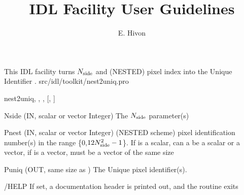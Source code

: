 
\sloppy


\title{\healpix IDL Facility User Guidelines}
 \section[nest2uniq]{ }
\label{idl:nest2uniq}
\author{E. Hivon}

\begin{facility}
{This IDL facility turns $N_{\rm side}$ and (NESTED) pixel index into the Unique Identifier  . 
}
{src/idl/toolkit/nest2uniq.pro}
\end{facility}

\begin{IDLformat}
{nest2uniq, 
,
,
[,%
]}
\end{IDLformat}


\begin{qualifiers}
  \begin{qulist}{} %

\item[{Nside}]  (IN, scalar or vector Integer) The \healpix $N_{\rm side}$ parameter(s)
\item[{Pnest}]  (IN, scalar or vector Integer) (NESTED scheme) pixel identification number(s) in the range \{0,$12N_{\rm side}^2-1$\}. If  is a scalar,  can a be a scalar or a vector, if  is a vector,
 must be a vector of the same size
\item[{Puniq}]  (OUT, same size as ) The \healpix Unique pixel identifier(s). 
  \end{qulist}
\end{qualifiers}

\begin{keywords}
  \begin{kwlist}{} %

\item[{/HELP}]  If set, a documentation header is printed out, and the routine exits
  \end{kwlist}
\end{keywords}


